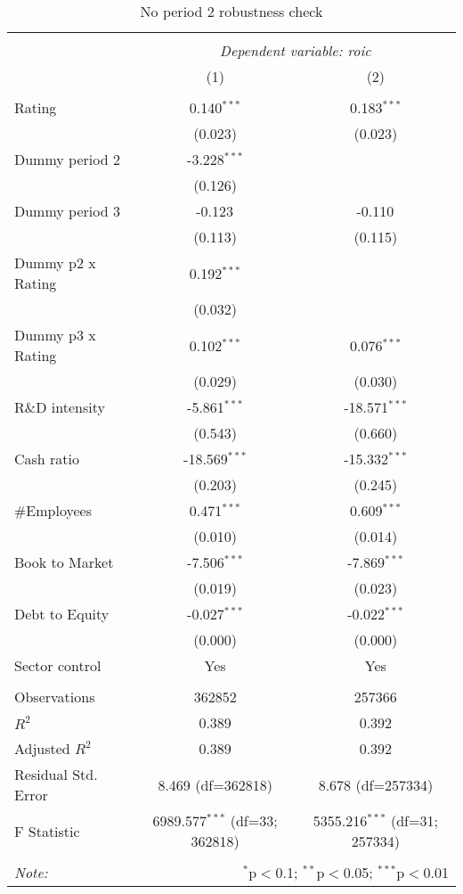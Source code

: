 \begin{table}[!htbp] \centering
  \caption{No period 2 robustness check}
\begin{tabular}{@{\extracolsep{5pt}}lcc}
\\[-1.8ex]\hline
\hline \\[-1.8ex]
& \multicolumn{2}{c}{\textit{Dependent variable: roic}} \
\cr \cline{2-3}
\\[-1.8ex] & (1) & (2) \\
\hline \\[-1.8ex]
 Rating & 0.140$^{***}$ & 0.183$^{***}$ \\
& (0.023) & (0.023) \\
 Dummy period 2 & -3.228$^{***}$ & \\
& (0.126) & \\
 Dummy period 3 & -0.123$^{}$ & -0.110$^{}$ \\
& (0.113) & (0.115) \\
 Dummy p2 x Rating & 0.192$^{***}$ & \\
& (0.032) & \\
 Dummy p3 x Rating & 0.102$^{***}$ & 0.076$^{***}$ \\
& (0.029) & (0.030) \\
 R\&D intensity & -5.861$^{***}$ & -18.571$^{***}$ \\
& (0.543) & (0.660) \\
 Cash ratio & -18.569$^{***}$ & -15.332$^{***}$ \\
& (0.203) & (0.245) \\
 #Employees & 0.471$^{***}$ & 0.609$^{***}$ \\
& (0.010) & (0.014) \\
 Book to Market & -7.506$^{***}$ & -7.869$^{***}$ \\
& (0.019) & (0.023) \\
 Debt to Equity & -0.027$^{***}$ & -0.022$^{***}$ \\
& (0.000) & (0.000) \\
 Sector control & Yes & Yes \\
\hline \\[-1.8ex]
 Observations & 362852 & 257366 \\
 $R^2$ & 0.389 & 0.392 \\
 Adjusted $R^2$ & 0.389 & 0.392 \\
 Residual Std. Error & 8.469 (df=362818) & 8.678 (df=257334) \\
 F Statistic & 6989.577$^{***}$ (df=33; 362818) & 5355.216$^{***}$ (df=31; 257334) \\
\hline
\hline \\[-1.8ex]
\textit{Note:} & \multicolumn{2}{r}{$^{*}$p$<$0.1; $^{**}$p$<$0.05; $^{***}$p$<$0.01} \\
\end{tabular}
\end{table}